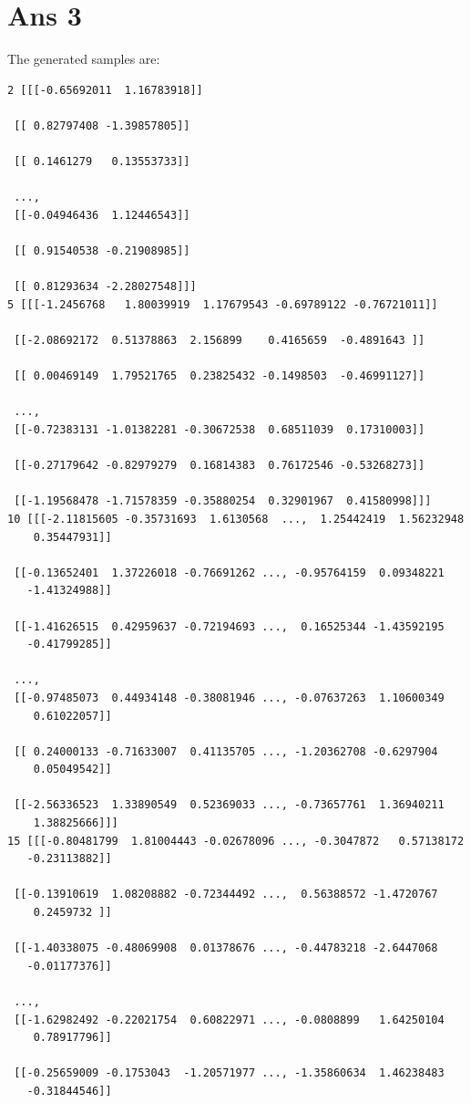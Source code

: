 \documentclass[10pt]{article}
\begin{document}
\section*{Ans 3}
\begin{flushleft}
The generated samples are:\\
\begin{lstlisting}
2 [[[-0.65692011  1.16783918]]

 [[ 0.82797408 -1.39857805]]

 [[ 0.1461279   0.13553733]]

 ..., 
 [[-0.04946436  1.12446543]]

 [[ 0.91540538 -0.21908985]]

 [[ 0.81293634 -2.28027548]]]
5 [[[-1.2456768   1.80039919  1.17679543 -0.69789122 -0.76721011]]

 [[-2.08692172  0.51378863  2.156899    0.4165659  -0.4891643 ]]

 [[ 0.00469149  1.79521765  0.23825432 -0.1498503  -0.46991127]]

 ..., 
 [[-0.72383131 -1.01382281 -0.30672538  0.68511039  0.17310003]]

 [[-0.27179642 -0.82979279  0.16814383  0.76172546 -0.53268273]]

 [[-1.19568478 -1.71578359 -0.35880254  0.32901967  0.41580998]]]
10 [[[-2.11815605 -0.35731693  1.6130568  ...,  1.25442419  1.56232948
    0.35447931]]

 [[-0.13652401  1.37226018 -0.76691262 ..., -0.95764159  0.09348221
   -1.41324988]]

 [[-1.41626515  0.42959637 -0.72194693 ...,  0.16525344 -1.43592195
   -0.41799285]]

 ..., 
 [[-0.97485073  0.44934148 -0.38081946 ..., -0.07637263  1.10600349
    0.61022057]]

 [[ 0.24000133 -0.71633007  0.41135705 ..., -1.20362708 -0.6297904
    0.05049542]]

 [[-2.56336523  1.33890549  0.52369033 ..., -0.73657761  1.36940211
    1.38825666]]]
15 [[[-0.80481799  1.81004443 -0.02678096 ..., -0.3047872   0.57138172
   -0.23113882]]

 [[-0.13910619  1.08208882 -0.72344492 ...,  0.56388572 -1.4720767
    0.2459732 ]]

 [[-1.40338075 -0.48069908  0.01378676 ..., -0.44783218 -2.6447068
   -0.01177376]]

 ..., 
 [[-1.62982492 -0.22021754  0.60822971 ..., -0.0808899   1.64250104
    0.78917796]]

 [[-0.25659009 -0.1753043  -1.20571977 ..., -1.35860634  1.46238483
   -0.31844546]]


\end{lstlisting}
\end{flushleft}
\end{document}
